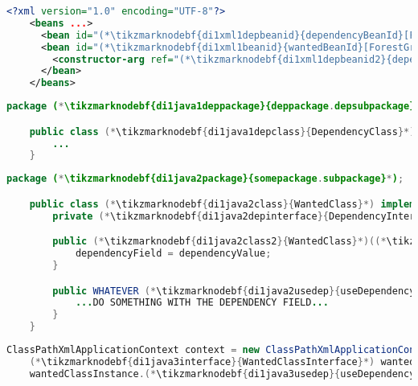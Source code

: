 \begin{lstlisting}[language=XML, title={Configuration XML}]
    <?xml version="1.0" encoding="UTF-8"?>
    <beans ...>
      <bean id="(*\tikzmarknodebf{di1xml1depbeanid}{dependencyBeanId}[ForestGreen]*)" class="(*\tikzmarknodebf{di1xml1deppackage}{deppackage.depsubpackage}[ForestGreen]*).(*\tikzmarknodebf{di1xml1depclass}{DependencyClass}[ForestGreen]*)"/>
      <bean id="(*\tikzmarknodebf{di1xml1beanid}{wantedBeanId}[ForestGreen]*)" class="(*\tikzmarknodebf{di1xml1package}{somepackage.subpackage}[ForestGreen]*).(*\tikzmarknodebf{di1xml1class}{WantedClass}[ForestGreen]*)">
        <constructor-arg ref="(*\tikzmarknodebf{di1xml1depbeanid2}{dependencyBeanId}[ForestGreen]*)"/>
      </bean>
    </beans>
\end{lstlisting}
\begin{lstlisting}[language=Java, title={Dependency class}]
    package (*\tikzmarknodebf{di1java1deppackage}{deppackage.depsubpackage}*);

    public class (*\tikzmarknodebf{di1java1depclass}{DependencyClass}*) implements (*\tikzmarknodebf{di1java1depinterface}{DependencyInterface}*) {
        ...
    }
\end{lstlisting}
\begin{lstlisting}[language=Java, title={Wanted class with the constructor}]
    package (*\tikzmarknodebf{di1java2package}{somepackage.subpackage}*);

    public class (*\tikzmarknodebf{di1java2class}{WantedClass}*) implements (*\tikzmarknodebf{di1java2interface}{WantedClassInterface}*) {
        private (*\tikzmarknodebf{di1java2depinterface}{DependencyInterface}*) dependencyField;

        public (*\tikzmarknodebf{di1java2class2}{WantedClass}*)((*\tikzmarknodebf{di1java2depinterface2}{DependencyInterface}*) dependencyValue) {
            dependencyField = dependencyValue;
        }

        public WHATEVER (*\tikzmarknodebf{di1java2usedep}{useDependency}*)() {
            ...DO SOMETHING WITH THE DEPENDENCY FIELD...
        }
    }
\end{lstlisting}
\begin{lstlisting}[language=Java, title={Usage}]
    ClassPathXmlApplicationContext context = new ClassPathXmlApplicationContext("configurationFile.xml");
    (*\tikzmarknodebf{di1java3interface}{WantedClassInterface}*) wantedClassInstance = context.getBean("(*\tikzmarknodebf{di1java3beanid}{wantedBeanId}[ForestGreen]*)", (*\tikzmarknodebf{di1java3interface2}{WantedClassInterface}*).class);
    wantedClassInstance.(*\tikzmarknodebf{di1java3usedep}{useDependency}*)();
\end{lstlisting}
